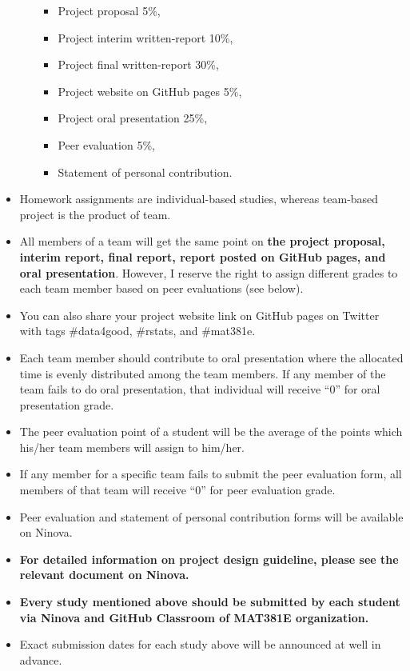 \documentclass[
  12pt,
]{article}
\providecommand{\tightlist}{%
  \setlength{\itemsep}{0pt}\setlength{\parskip}{0pt}}
\begin{document}
\begin{itemize}
\begin{itemize}
    \begin{itemize}
    \tightlist
    \item
      Project proposal 5\%,
    \item
      Project interim written-report 10\%,
    \item
      Project final written-report 30\%,
    \item
      Project website on GitHub pages 5\%,
    \item
      Project oral presentation 25\%,
    \item
      Peer evaluation 5\%,
    \item
      Statement of personal contribution.
    \end{itemize}
  \end{itemize}
\item
  Homework assignments are individual-based studies, whereas team-based
  project is the product of team.
\item
  All members of a team will get the same point on \textbf{the project
  proposal, interim report, final report, report posted on GitHub pages,
  and oral presentation}. However, I reserve the right to assign
  different grades to each team member based on peer evaluations (see
  below).
\item
  You can also share your project website link on GitHub pages on
  Twitter with tags \#data4good, \#rstats, and \#mat381e.
\item
  Each team member should contribute to oral presentation where the
  allocated time is evenly distributed among the team members. If any
  member of the team fails to do oral presentation, that individual will
  receive ``0'' for oral presentation grade.
\item
  The peer evaluation point of a student will be the average of the
  points which his/her team members will assign to him/her.
\item
  If any member for a specific team fails to submit the peer evaluation
  form, all members of that team will receive ``0'' for peer evaluation
  grade.
\item
  Peer evaluation and statement of personal contribution forms will be
  available on Ninova.
\item
  \textbf{For detailed information on project design guideline, please
  see the relevant document on Ninova.}
\item
  \textbf{Every study mentioned above should be submitted by each
  student via Ninova and GitHub Classroom of MAT381E organization.}
\item
  Exact submission dates for each study above will be announced at well
  in advance.
\end{itemize}
\end{document}
